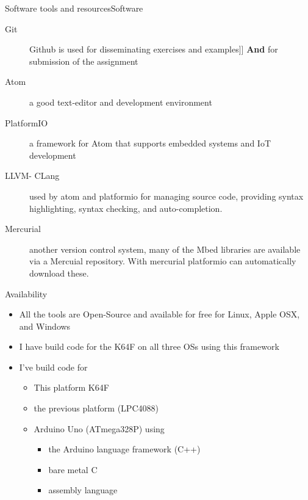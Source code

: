 \documentclass[xcolor=svgnames]{beamer}
\begin{document}
\begin{frame}{Software tools and resources}{Software}
  \begin{description}
    \item[Git] Github is used for disseminating exercises and examples]]
    \alert{\textbf{And}} for submission of the assignment
    \item[Atom] a good text-editor and development environment
    \item[PlatformIO] a framework for Atom that supports embedded systems and IoT development
    \item[LLVM- CLang] used by atom and platformio for managing source code, providing syntax highlighting, syntax checking, and auto-completion.
    \item[Mercurial] another version control system, many of the Mbed libraries are available via a Mercuial repository.   With mercurial platformio can automatically download these.
  \end{description}
\end{frame}

\begin{frame}{Availability}
  \begin{itemize}
    \item All the tools are Open-Source and available for free for Linux, Apple OSX, and Windows
    \item I have build code for the K64F on all three OSs using this framework
    \item I've build code for
    \begin{itemize}
      \item This platform K64F
      \item the previous platform (LPC4088)
      \item Arduino Uno (ATmega328P) using
      \begin{itemize}
        \item the Arduino language framework (C++)
        \item bare metal C
        \item assembly language
      \end{itemize}
    \end{itemize}
  \end{itemize}

\end{frame}
\end{document}
